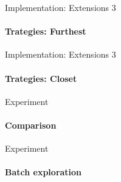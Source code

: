 \documentclass{beamer}
\begin{document}
\begin{frame}[fragile]{Implementation: Extensions 3}
\framesubtitle{Trategies: Furthest}
    

\end{frame}

\begin{frame}[fragile]{Implementation: Extensions 3}
\framesubtitle{Trategies: Closet}
    

\end{frame}

\begin{frame}[fragile]{Experiment}
\framesubtitle{Comparison}


\end{frame}

\begin{frame}[fragile]{Experiment}
\framesubtitle{Batch exploration}


\end{frame}

\backmatter
\end{document}
